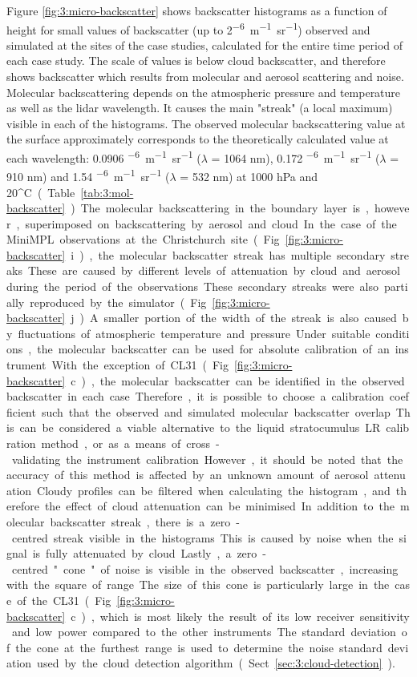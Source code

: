 Figure \ref{fig:3:micro-backscatter} shows backscatter histograms as a function of
height for small values of backscatter (up to 2\unit{^{-6}m^{-1}sr^{-1}})
observed and simulated at the sites of the case studies, calculated for
the entire time period of each case study. The scale of values is below
cloud backscatter, and therefore shows backscatter which results from molecular and
aerosol scattering and noise. Molecular backscattering depends on the
atmospheric pressure and temperature as well as the lidar wavelength.
It causes the main "streak" (a local maximum) visible in each of the histograms. The observed molecular
backscattering value at the surface approximately corresponds to the
theoretically calculated value at each wavelength: 0.0906 \unit{^{-6}m^{-1}sr^{-1}} ($\lambda$ = 1064 nm),
0.172 \unit{^{-6}m^{-1}sr^{-1}} ($\lambda$ = 910 nm) and 1.54 \unit{^{-6}m^{-1}sr^{-1}} ($\lambda$ = 532 nm) at 1000 hPa and 20\unit{^\circ C}
(Table \ref{tab:3:mol-backscatter}). The molecular backscattering in the boundary
layer is, however, superimposed on backscattering by aerosol and cloud. In the case
of the MiniMPL observations at the Christchurch site (Fig. \ref{fig:3:micro-backscatter}i),
the molecular backscatter streak has multiple secondary streaks. These are caused by different levels
of attenuation by cloud and aerosol during the period of the observations.
These secondary streaks were also partially reproduced by the simulator
(Fig. \ref{fig:3:micro-backscatter}j).
A smaller portion of the width of the streak is also caused by fluctuations of atmospheric
temperature and pressure. Under suitable conditions, the molecular backscatter
can be used for absolute calibration of an instrument. With the exception 
of CL31 (Fig. \ref{fig:3:micro-backscatter}c), the molecular backscatter can
be identified in the observed backscatter in each case. Therefore, it is possible to
choose a calibration coefficient such that the observed and simulated
molecular backscatter overlap. This can be considered a viable alternative
to the liquid stratocumulus LR calibration method, or as a means of
cross-validating the instrument calibration. However, it should be noted that the accuracy of this method
is affected by an unknown amount of aerosol attenuation. Cloudy profiles
can be filtered when calculating the histogram, and therefore the effect of
cloud attenuation can be minimised.
In addition to the molecular backscatter streak,
there is a zero-centred streak visible in the histograms. This is caused
by noise when the signal is fully attenuated by cloud. Lastly, a zero-centred
"cone" of noise is visible in the observed backscatter, increasing with the
square of range. The size of this cone is particularly large in the case
of the CL31 (Fig. \ref{fig:3:micro-backscatter}c), which is most likely the result
of its low receiver sensitivity and low power compared to the other
instruments. The standard deviation of the cone at the furthest range
is used to determine the noise standard deviation used by the cloud
detection algorithm (Sect. \ref{sec:3:cloud-detection}).

